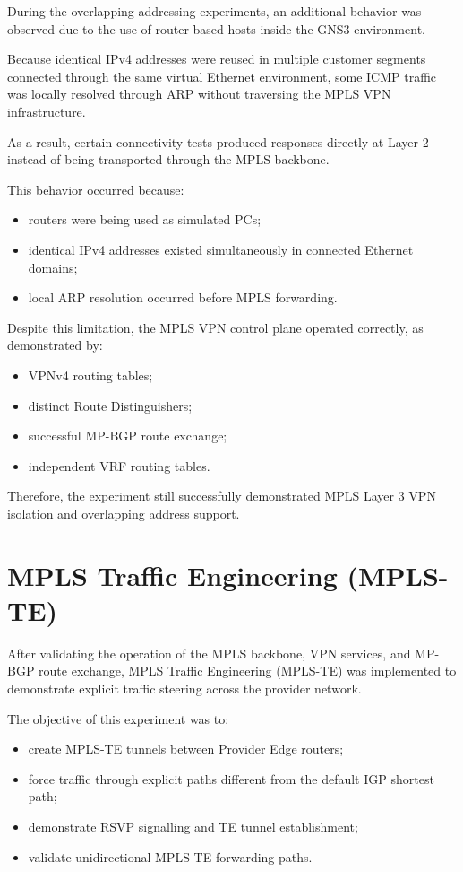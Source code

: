\documentclass[12pt]{article}
\begin{document}
During the overlapping addressing experiments, an additional behavior was observed due to the use of router-based hosts inside the GNS3 environment.

Because identical IPv4 addresses were reused in multiple customer segments connected through the same virtual Ethernet environment, some ICMP traffic was locally resolved through ARP without traversing the MPLS VPN infrastructure.

As a result, certain connectivity tests produced responses directly at Layer 2 instead of being transported through the MPLS backbone.

This behavior occurred because:
\begin{itemize}
    \item routers were being used as simulated PCs;
    \item identical IPv4 addresses existed simultaneously in connected Ethernet domains;
    \item local ARP resolution occurred before MPLS forwarding.
\end{itemize}

Despite this limitation, the MPLS VPN control plane operated correctly, as demonstrated by:
\begin{itemize}
    \item VPNv4 routing tables;
    \item distinct Route Distinguishers;
    \item successful MP-BGP route exchange;
    \item independent VRF routing tables.
\end{itemize}

Therefore, the experiment still successfully demonstrated MPLS Layer 3 VPN isolation and overlapping address support.

\section{MPLS Traffic Engineering (MPLS-TE)}

After validating the operation of the MPLS backbone, VPN services, and MP-BGP route exchange, MPLS Traffic Engineering (MPLS-TE) was implemented to demonstrate explicit traffic steering across the provider network.

The objective of this experiment was to:
\begin{itemize}
    \item create MPLS-TE tunnels between Provider Edge routers;
    \item force traffic through explicit paths different from the default IGP shortest path;
    \item demonstrate RSVP signalling and TE tunnel establishment;
    \item validate unidirectional MPLS-TE forwarding paths.
\end{itemize}
\end{document}
